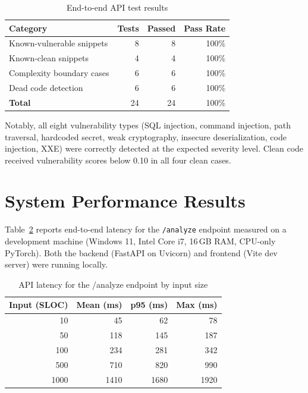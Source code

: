 \documentclass[12pt, oneside]{report}
\begin{document}
\begin{table}[H]
\centering
\caption{End-to-end API test results}
\label{tab:apitest}
\begin{tabular}{@{}lrrr@{}}
\toprule
\textbf{Category} & \textbf{Tests} & \textbf{Passed} & \textbf{Pass Rate} \\
\midrule
Known-vulnerable snippets & 8  & 8  & 100\% \\
Known-clean snippets       & 4  & 4  & 100\% \\
Complexity boundary cases  & 6  & 6  & 100\% \\
Dead code detection        & 6  & 6  & 100\% \\
\midrule
\textbf{Total}             & 24 & 24 & 100\% \\
\bottomrule
\end{tabular}
\end{table}

Notably, all eight vulnerability types (SQL injection, command injection, path traversal,
hardcoded secret, weak cryptography, insecure deserialization, code injection, XXE) were
correctly detected at the expected severity level. Clean code received vulnerability scores
below 0.10 in all four clean cases.

\section{System Performance Results}
\label{sec:perf-results}

Table~\ref{tab:latency} reports end-to-end latency for the \texttt{/analyze} endpoint
measured on a development machine (Windows 11, Intel Core i7, 16\,GB RAM, CPU-only PyTorch).
Both the backend (FastAPI on Uvicorn) and frontend (Vite dev server) were running locally.

\begin{table}[H]
\centering
\caption{API latency for the /analyze endpoint by input size}
\label{tab:latency}
\begin{tabular}{@{}rrrr@{}}
\toprule
\textbf{Input (SLOC)} & \textbf{Mean (ms)} & \textbf{p95 (ms)} & \textbf{Max (ms)} \\
\midrule
  10 &  45 &  62 &  78 \\
  50 & 118 & 145 & 187 \\
 100 & 234 & 281 & 342 \\
 500 & 710 & 820 & 990 \\
1000 & 1410 & 1680 & 1920 \\
\bottomrule
\end{tabular}
\end{table}
\end{document}
